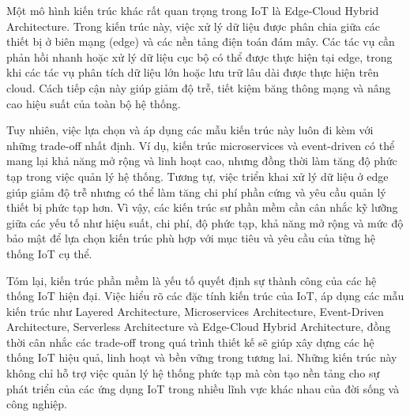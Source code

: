 Một mô hình kiến trúc khác rất quan trọng trong IoT là Edge-Cloud Hybrid Architecture. Trong kiến trúc này, việc xử lý dữ liệu được phân chia giữa các thiết bị ở biên mạng (edge) và các nền tảng điện toán đám mây. Các tác vụ cần phản hồi nhanh hoặc xử lý dữ liệu cục bộ có thể được thực hiện tại edge, trong khi các tác vụ phân tích dữ liệu lớn hoặc lưu trữ lâu dài được thực hiện trên cloud. Cách tiếp cận này giúp giảm độ trễ, tiết kiệm băng thông mạng và nâng cao hiệu suất của toàn bộ hệ thống.

Tuy nhiên, việc lựa chọn và áp dụng các mẫu kiến trúc này luôn đi kèm với những trade-off nhất định. Ví dụ, kiến trúc microservices và event-driven có thể mang lại khả năng mở rộng và linh hoạt cao, nhưng đồng thời làm tăng độ phức tạp trong việc quản lý hệ thống. Tương tự, việc triển khai xử lý dữ liệu ở edge giúp giảm độ trễ nhưng có thể làm tăng chi phí phần cứng và yêu cầu quản lý thiết bị phức tạp hơn. Vì vậy, các kiến trúc sư phần mềm cần cân nhắc kỹ lưỡng giữa các yếu tố như hiệu suất, chi phí, độ phức tạp, khả năng mở rộng và mức độ bảo mật để lựa chọn kiến trúc phù hợp với mục tiêu và yêu cầu của từng hệ thống IoT cụ thể.

Tóm lại, kiến trúc phần mềm là yếu tố quyết định sự thành công của các hệ thống IoT hiện đại. Việc hiểu rõ các đặc tính kiến trúc của IoT, áp dụng các mẫu kiến trúc như Layered Architecture, Microservices Architecture, Event-Driven Architecture, Serverless Architecture và Edge-Cloud Hybrid Architecture, đồng thời cân nhắc các trade-off trong quá trình thiết kế sẽ giúp xây dựng các hệ thống IoT hiệu quả, linh hoạt và bền vững trong tương lai. Những kiến trúc này không chỉ hỗ trợ việc quản lý hệ thống phức tạp mà còn tạo nền tảng cho sự phát triển của các ứng dụng IoT trong nhiều lĩnh vực khác nhau của đời sống và công nghiệp.